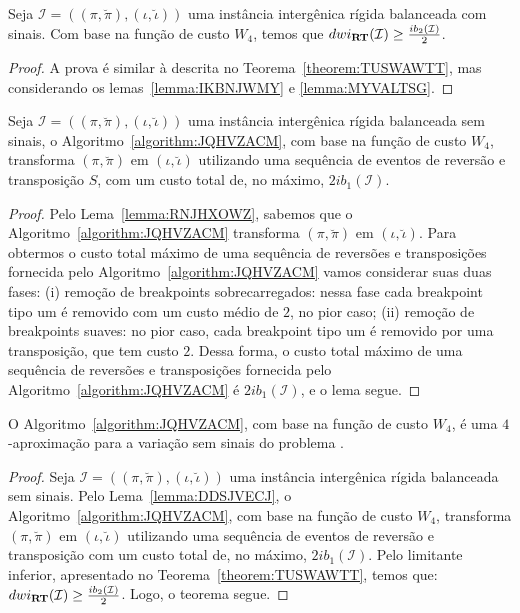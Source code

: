 \begin{theorem}\label{theorem:RPTOVHAP}
Seja $\mathcal{I} = ((\pi,\breve\pi),(\iota,\breve\iota))$ uma instância intergênica rígida balanceada com sinais. Com base na função de custo $W_4$, temos que $dwi_{\textbf{RT}}(\mathcal{I}) \ge \frac{ib_2(\mathcal{I})}{2}$.
\begin{proof}
A prova é similar à descrita no Teorema~\ref{theorem:TUSWAWTT}, mas considerando os lemas~\ref{lemma:IKBNJWMY} e \ref{lemma:MYVALTSG}.
\end{proof}
\end{theorem}

\begin{lemma}\label{lemma:DDSJVECJ}
Seja $\mathcal{I}=((\pi,\breve\pi),(\iota,\breve\iota))$ uma instância intergênica rígida balanceada sem sinais, o Algoritmo~\ref{algorithm:JQHVZACM}, com base na função de custo $W_4$, transforma $(\pi,\breve\pi)$ em $(\iota,\breve\iota)$ utilizando uma sequência de eventos de reversão e transposição $S$, com um custo total de, no máximo, $2ib_1(\mathcal{I})$.
\end{lemma}
\begin{proof}
Pelo Lema~\ref{lemma:RNJHXOWZ}, sabemos que o Algoritmo~\ref{algorithm:JQHVZACM} transforma $(\pi,\breve\pi)$ em $(\iota,\breve\iota)$. Para obtermos o custo total máximo de uma sequência de reversões e transposições fornecida pelo Algoritmo~\ref{algorithm:JQHVZACM} vamos considerar suas duas fases: (i) remoção de breakpoints sobrecarregados: nessa fase cada breakpoint tipo um é removido com um custo médio de $2$, no pior caso; (ii) remoção de breakpoints suaves: no pior caso, cada breakpoint tipo um é removido por uma transposição, que tem custo $2$. Dessa forma, o custo total máximo de uma sequência de reversões e transposições fornecida pelo Algoritmo~\ref{algorithm:JQHVZACM} é $2ib_1(\mathcal{I})$, e o lema segue. 
\end{proof}

\begin{theorem}\label{theorem:CQXBDUDY}
O Algoritmo~\ref{algorithm:JQHVZACM}, com base na função de custo $W_4$, é uma $4$-aproximação para a variação sem sinais do problema \SbWIRT{}.
\end{theorem}
\begin{proof}
Seja $\mathcal{I} = ((\pi,\breve\pi),(\iota,\breve\iota))$ uma instância intergênica rígida balanceada sem sinais. Pelo Lema~\ref{lemma:DDSJVECJ}, o Algoritmo~\ref{algorithm:JQHVZACM}, com base na função de custo $W_4$, transforma $(\pi,\breve\pi)$ em $(\iota,\breve\iota)$ utilizando uma sequência de eventos de reversão e transposição com um custo total de, no máximo, $2ib_1(\mathcal{I})$. Pelo limitante inferior, apresentado no Teorema~\ref{theorem:TUSWAWTT}, temos que: $dwi_{\textbf{RT}}(\mathcal{I}) \ge \frac{ib_2(\mathcal{I})}{2}$. Logo, o teorema segue.
\end{proof}

